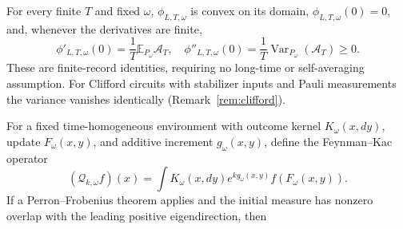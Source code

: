 \documentclass[aps,prx,reprint,superscriptaddress,nobibnotes,longbibliography]{revtex4-2}
\theoremstyle{remark}
\newcommand{\E}{\mathbb E}
\begin{document}
For every finite $T$ and fixed $\omega$, $\phi_{L,T,\omega}$ is convex on its domain, $\phi_{L,T,\omega}(0)=0$, and, whenever the derivatives are finite,
\begin{equation}
 \phi'_{L,T,\omega}(0)=\frac1T\E_{P_\omega}\mathcal A_T,
 \quad
 \phi''_{L,T,\omega}(0)=\frac1T\operatorname{Var}_{P_\omega}(\mathcal A_T)\ge0.
 \label{eq:finiteconvex}
\end{equation}
These are finite-record identities, requiring no long-time or self-averaging assumption.  For Clifford circuits with stabilizer inputs and Pauli measurements the variance vanishes identically (Remark~\ref{rem:clifford}).

For a fixed time-homogeneous environment with outcome kernel $K_\omega(x,dy)$, update $F_\omega(x,y)$, and additive increment $g_\omega(x,y)$, define the Feynman--Kac operator~\cite{DelMoral2004}
\begin{equation}
 (\mathcal Q_{k,\omega}f)(x)=\int K_\omega(x,dy)e^{kg_\omega(x,y)}f(F_\omega(x,y)).
 \label{eq:FK}
\end{equation}
If a Perron--Frobenius theorem applies and the initial measure has nonzero overlap with the leading positive eigendirection, then
\end{document}
